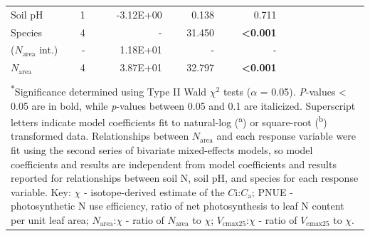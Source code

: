 \begin{landscape}
\begin{table}[]
{\begin{tabular}{p{2.5cm}p{0.5cm}p{2cm}p{1.5cm}p{1.5cm}p{2cm}p{1.5cm}p{1.5cm}p{2cm}p{1.5cm}p{1.5cm}}
                 Soil pH & \multicolumn{1}{r}{1}
                 & \multicolumn{1}{r}{-3.12E+00} & \multicolumn{1}{r}{0.138} & \multicolumn{1}{r}{0.711}
                 &&&&&& 
                 \\

                 Species & \multicolumn{1}{r}{4}
                 & \multicolumn{1}{r}{-} & \multicolumn{1}{r}{31.450} & \multicolumn{1}{r}{\textbf{\textless{}0.001}}
                 \\
                 \hline

                 ($N_\mathrm{area}$ int.) & \multicolumn{1}{r}{-}
                 & \multicolumn{1}{r}{1.18E+01} & \multicolumn{1}{r}{-} & \multicolumn{1}{r}{-}
                 &&&&&& 
                 \\

                 $N_\mathrm{area}$ & \multicolumn{1}{r}{4}
                 & \multicolumn{1}{r}{3.87E+01} & \multicolumn{1}{r}{32.797} & \multicolumn{1}{r}{\textbf{\textless{}0.001}}
                 &&&&&
                 \\
                 \hline

                 \\

                 \multicolumn{11}{p{22.5cm}}{\textsuperscript{$*$}Significance determined using Type II Wald $\chi^{2}$ tests ($\alpha$ = 0.05). \textit{P}-values < 0.05 are in bold, while \textit{p}-values between 0.05 and 0.1 are italicized. Superscript letters indicate model coefficients fit to natural-log (\textsuperscript{a}) or square-root (\textsuperscript{b}) transformed data. Relationships between $N_\mathrm{area}$ and each response variable were fit using the second series of bivariate mixed-effects models, so model coefficients and results are independent from model coefficients and results reported for relationships between soil N, soil pH, and species for each response variable. Key: $\chi$ - isotope-derived estimate of the $C\mathrm{i}$:$C_\mathrm{a}$; PNUE - photosynthetic N use efficiency, ratio of net photosynthesis to leaf N content per unit leaf area; $N_\mathrm{area}$:$\chi$ - ratio of $N_\mathrm{area}$ to $\chi$; $V_\mathrm{cmax25}$:$\chi$ - ratio of $V_\mathrm{cmax25}$ to $\chi$.}
        \end{tabular}}
        \label{tab:table3.4}
        \end{table}
    \end{landscape}
    \clearpage

